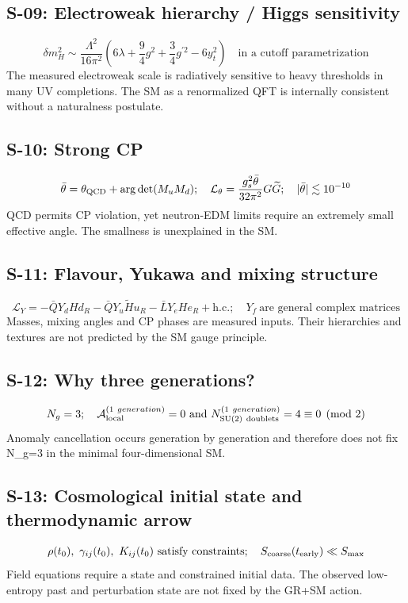 \subsection*{S-09: Electroweak hierarchy / Higgs sensitivity}
\begingroup\small
\begin{equation*}
\delta m_H^2\sim\frac{\Lambda^2}{16\pi^2}\left(6\lambda+\frac94g^2+\frac34g^{\prime2}-6y_t^2\right)\quad\text{in a cutoff parametrization}
\end{equation*}
\endgroup
The measured electroweak scale is radiatively sensitive to heavy thresholds in many UV completions. The SM as a renormalized QFT is internally consistent without a naturalness postulate.
\subsection*{S-10: Strong CP}
\begingroup\small
\begin{equation*}
\bar\theta=\theta_{\rm QCD}+\arg\det(M_uM_d);\allowbreak\quad \mathcal L_\theta=\frac{g_s^2\bar\theta}{32\pi^2}G\widetilde G;\allowbreak\quad |\bar\theta|\lesssim10^{-10}
\end{equation*}
\endgroup
QCD permits CP violation, yet neutron-EDM limits require an extremely small effective angle. The smallness is unexplained in the SM.
\subsection*{S-11: Flavour, Yukawa and mixing structure}
\begingroup\small
\begin{equation*}
\mathcal L_Y=-\bar QY_dHd_R-\bar QY_u\widetilde H u_R-\bar LY_eHe_R+\mathrm{h.c.};\allowbreak\quad Y_f\ \text{are general complex matrices}
\end{equation*}
\endgroup
Masses, mixing angles and CP phases are measured inputs. Their hierarchies and textures are not predicted by the SM gauge principle.
\subsection*{S-12: Why three generations?}
\begingroup\small
\begin{equation*}
N_g=3;\allowbreak\quad \mathcal A_{\rm local}^{(1\ generation)}=0\ \text{and}\ N_{\rm SU(2)\ doublets}^{(1\ generation)}=4\equiv0\pmod2
\end{equation*}
\endgroup
Anomaly cancellation occurs generation by generation and therefore does not fix N\_g=3 in the minimal four-dimensional SM.
\subsection*{S-13: Cosmological initial state and thermodynamic arrow}
\begingroup\small
\begin{equation*}
\rho(t_0),\ \gamma_{ij}(t_0),\ K_{ij}(t_0)\ \text{satisfy constraints};\allowbreak\quad S_{\rm coarse}(t_{\rm early})\ll S_{\rm max}
\end{equation*}
\endgroup
Field equations require a state and constrained initial data. The observed low-entropy past and perturbation state are not fixed by the GR+SM action.
